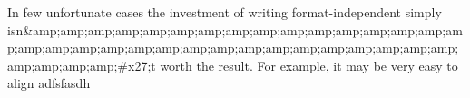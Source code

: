 
In few unfortunate cases the investment of writing format-independent \latex simply isn&amp;amp;amp;amp;amp;amp;amp;amp;amp;amp;amp;amp;amp;amp;amp;amp;amp;amp;amp;amp;amp;amp;amp;amp;amp;amp;amp;amp;amp;amp;amp;amp;amp;amp;amp;amp;#x27;t worth the result. For example, it may be very easy to align adfsfasdh